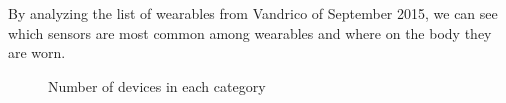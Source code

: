 By analyzing the list of wearables from Vandrico\cite{LISTOFWEARABLES} of September 2015, we can see which sensors are most common among wearables and where on the body they are worn. 
\begin{figure}[!htb]
    \centering
    
    \caption{Number of devices in each category}
    \label{fig:wearables-category}
\end{figure}


